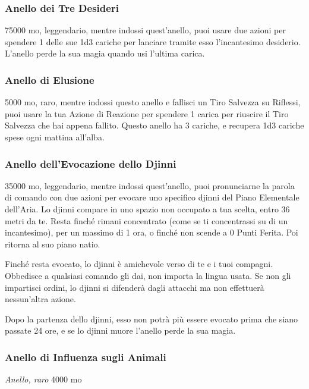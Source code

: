 \begin{multicols}{2}
\subsubsection*{Anello dei Tre Desideri}
75000 mo, leggendario, mentre indossi quest'anello, puoi usare due azioni per spendere 1 delle sue 1d3 cariche per lanciare tramite esso l'incantesimo desiderio. L'anello perde la sua magia quando usi l'ultima carica.

\subsubsection*{Anello di Elusione}
5000 mo, raro, mentre indossi questo anello e fallisci un Tiro Salvezza su Riflessi, puoi usare la tua Azione di Reazione per spendere 1 carica per riuscire il Tiro Salvezza che hai appena fallito. Questo anello ha 3 cariche, e recupera 1d3 cariche spese ogni mattina all'alba.

\subsubsection*{Anello dell'Evocazione dello Djinni}
35000 mo, leggendario, mentre indossi quest'anello, puoi pronunciarne la parola di comando con due azioni per evocare uno specifico djinni del Piano Elementale dell'Aria. Lo djinni compare in uno spazio non occupato a tua scelta, entro 36 metri da te. Resta finché rimani concentrato (come se ti concentrassi su di un incantesimo), per un massimo di 1 ora, o finché non scende a 0 Punti Ferita. Poi ritorna al suo piano natio.

Finché resta evocato, lo djinni è amichevole verso di te e i tuoi compagni. Obbedisce a qualsiasi comando gli dai, non importa la lingua usata. Se non gli impartisci ordini, lo djinni si difenderà dagli attacchi ma non effettuerà nessun'altra azione.

Dopo la partenza dello djinni, esso non potrà più essere evocato prima che siano passate 24 ore, e se lo djinni muore l'anello perde la sua magia.

\subsubsection*{Anello di Influenza sugli Animali} \textit{Anello, raro} 4000 mo


\end{multicols}
